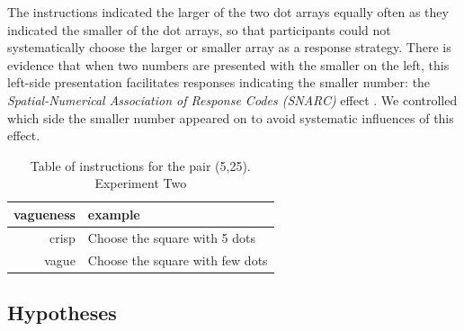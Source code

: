 \documentclass[doc,apacite]{apa6}
\begin{document}
The instructions indicated the larger of the two dot arrays equally often as they indicated the smaller of the dot arrays, so that participants could not systematically choose the larger or smaller array as a response strategy.
There is evidence that when two numbers are presented with the smaller on the left, this left-side presentation facilitates responses indicating the smaller number: the \emph{Spatial-Numerical Association of Response Codes (SNARC)} effect \cite{dehaene1993mental, gevers2006automatic}. We controlled which side the smaller number appeared on to avoid systematic influences of this effect. 

\begin{table}[htbp]
\caption{Table of instructions for the pair (5,25). Experiment Two}
\label{instructionse2}
\begin{tabular}{rl}
\toprule
vagueness&example\\
\midrule
crisp 	& 	Choose the square with 5 dots \\
vague	&	Choose the square with few dots\\
\bottomrule
\end{tabular}
\end{table}

\subsection{Hypotheses}
\end{document}
